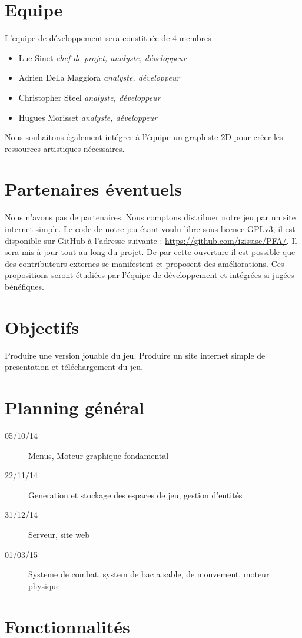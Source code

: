 \documentclass{article}
\begin{document}
\section{Equipe}
L'equipe de développement sera constituée de 4 membres :
\begin{itemize}
  \item Luc Sinet \textit{chef de projet, analyste, développeur}
  \item Adrien Della Maggiora \textit{analyste, développeur}
  \item Christopher Steel \textit{analyste, développeur}
  \item Hugues Morisset \textit{analyste, développeur}
\end{itemize}
Nous souhaitons également intégrer à l'équipe un graphiste 2D pour
créer les ressources artistiques nécessaires.
\section{Partenaires éventuels}
Nous n'avons pas de partenaires. Nous comptons distribuer notre jeu
par un site internet simple. Le code de notre jeu étant voulu libre
sous licence GPLv3, il est disponible sur GitHub à l'adresse suivante :
\url{https://github.com/izissise/PFA/}. Il sera mis à jour tout au long
du projet. De par cette ouverture il est possible que des contributeurs
externes se manifestent et proposent des améliorations. Ces propositions
seront étudiées par l'équipe de développement et intégrées si jugées
bénéfiques.
\section{Objectifs}
Produire une version jouable du jeu.
Produire un site internet simple de presentation et téléchargement du jeu.
\section{Planning général}
\begin{description}
\item[05/10/14] Menus, Moteur graphique fondamental
\item[22/11/14] Generation et stockage des espaces de jeu, gestion d'entités
\item[31/12/14] Serveur, site web
\item[01/03/15] Systeme de combat, system de bac a sable, de mouvement, moteur physique
\end{description}
\section{Fonctionnalités}
\end{document}
